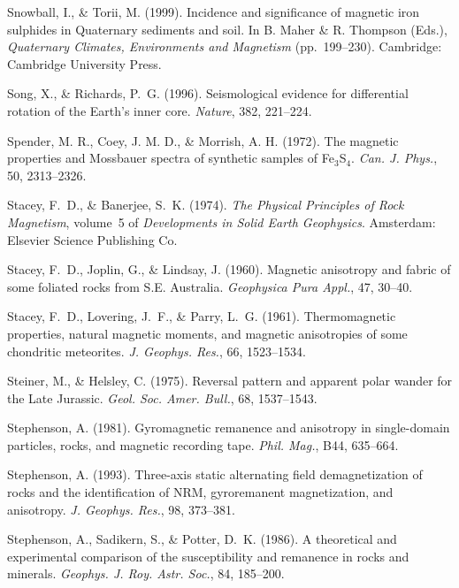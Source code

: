 \documentclass[,plain]{tauxe}
\begin{document}
\begin{thebibliography}{}
\bibitem{}%
Snowball, I., \& Torii, M. (1999).
Incidence and significance of magnetic iron sulphides in Quaternary sediments and soil.
In B. Maher \& R. Thompson (Eds.), {\it Quaternary Climates, Environments and Magnetism} (pp.\ 199--230). Cambridge: Cambridge University Press.

\bibitem{}%
Song, X., \& Richards, P.~G. (1996).
Seismological evidence for differential rotation of the Earth's inner core.
{\it Nature}, 382, 221--224.

\bibitem{}%
Spender, M. R., Coey, J. M. D., \& Morrish, A. H. (1972). The
magnetic properties and Mossbauer spectra of synthetic samples of
Fe$_3$S$_4$. {\it Can. J. Phys.}, 50, 2313--2326.

\bibitem{}%
Stacey, F.~D., \& Banerjee, S.~K. (1974).
{\it The Physical Principles of Rock Magnetism}, volume~5 of {\it
Developments in Solid Earth Geophysics}.
Amsterdam:
Elsevier Science Publishing Co.

\bibitem{}%
Stacey, F.~D., Joplin, G., \& Lindsay, J. (1960).
Magnetic anisotropy and fabric of some foliated rocks from S.E. Australia.
{\it Geophysica Pura Appl.}, 47, 30--40.

\bibitem{}%
Stacey, F.~D., Lovering, J.~F., \& Parry, L.~G. (1961).
Thermomagnetic properties, natural magnetic moments, and magnetic anisotropies of some chondritic meteorites.
{\it J. Geophys. Res.}, 66, 1523--1534.

\bibitem{}%
Steiner, M., \& Helsley, C. (1975).
Reversal pattern and apparent polar wander for the Late Jurassic.
{\it Geol. Soc. Amer. Bull.}, 68, 1537--1543.

\bibitem{}%
Stephenson, A. (1981).
Gyromagnetic remanence and anisotropy in single-domain particles, rocks, and magnetic recording tape.
{\it Phil. Mag.}, B44, 635--664.

\bibitem{}%
Stephenson, A. (1993).
Three-axis static alternating field demagnetization of rocks and the identification of NRM, gyroremanent magnetization, and anisotropy.
{\it J. Geophys. Res.}, 98, 373--381.

\bibitem{}%
Stephenson, A., Sadikern, S., \& Potter, D.~K. (1986).
A theoretical and experimental comparison of the susceptibility and remanence in rocks and minerals.
{\it Geophys. J. Roy. Astr. Soc.}, 84, 185--200.


\end{thebibliography}
\end{document}
